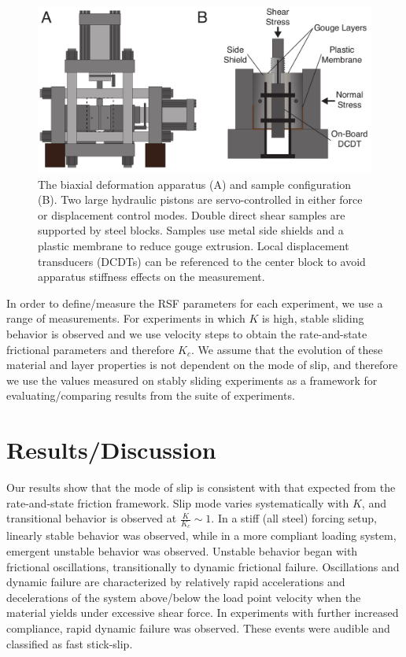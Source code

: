 \documentclass[11pt]{article}
\begin{document}
\begin{figure}
    \centering
    \includegraphics[scale=0.5]{../Figures/Fig_Biax_Schematic/biax_schematic.pdf}
       \caption{The biaxial deformation apparatus (A) and sample configuration (B).
       Two large hydraulic pistons are servo-controlled in either force or
       displacement control modes. Double direct shear samples are supported by
       steel blocks. Samples use metal side shields and a plastic membrane to
       reduce gouge extrusion.  Local displacement transducers (DCDTs) can be
       referenced to the center block to avoid apparatus stiffness effects on
       the measurement.}
      \label{Fig:Biax Schematic}
\end{figure}

In order to define/measure the RSF parameters for each experiment, we use a
range of measurements. For experiments in which $K$ is high, stable sliding
behavior is  observed and we use velocity steps to obtain the rate-and-state
frictional parameters and therefore $K_c$.  We assume that the evolution of
these material and layer properties is not dependent on the mode of slip, and
therefore we use the values measured on stably sliding experiments as a
framework for evaluating/comparing results from the suite of experiments.


\section{Results/Discussion}

Our results show that the mode of slip is consistent with that expected from the
rate-and-state friction framework. Slip mode varies systematically with $K$,
and transitional behavior is observed at $\frac{K}{K_c} \sim 1$. In a stiff (all
steel) forcing setup, linearly stable behavior was observed, while in a
more compliant loading system, emergent unstable behavior was observed. Unstable
behavior began with frictional oscillations, transitionally to dynamic frictional
failure. Oscillations and dynamic failure are characterized by relatively rapid
accelerations and decelerations of the system above/below the load point
velocity when the material yields under excessive shear force. In experiments with
further increased compliance, rapid dynamic failure was observed. These events
were audible and classified as fast stick-slip.
\end{document}
